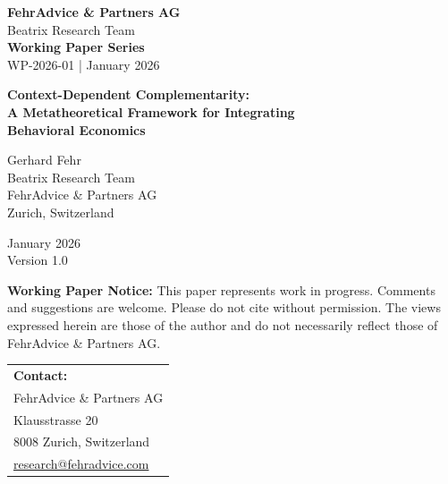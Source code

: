 \documentclass[12pt,a4paper]{article}
\theoremstyle{definition}
\begin{document}
\begin{titlepage}
\centering

\vspace*{1cm}

\begin{tcolorbox}[
    colback=blue!5!white,
    colframe=blue!75!black,
    width=\textwidth,
    arc=0mm,
    boxrule=1pt
]
\centering
\large\textbf{FehrAdvice \& Partners AG}\\[0.5em]
\normalsize Beatrix Research Team\\[1em]
\Large\textbf{Working Paper Series}\\[0.5em]
\normalsize WP-2026-01 | January 2026
\end{tcolorbox}

\vspace{2cm}

{\LARGE\bfseries Context-Dependent Complementarity:\\[0.5em]
A Metatheoretical Framework for Integrating\\[0.3em]
Behavioral Economics}

\vspace{2cm}

{\Large Gerhard Fehr}\\[0.5em]
{\large Beatrix Research Team}\\[0.3em]
{\normalsize FehrAdvice \& Partners AG}\\[0.3em]
{\normalsize Zurich, Switzerland}

\vspace{2cm}

{\large January 2026}\\[1em]
{\normalsize Version 1.0}

\vspace{2cm}

\begin{tcolorbox}[
    colback=yellow!10!white,
    colframe=orange!75!black,
    width=0.9\textwidth,
    arc=2mm
]
\small
\textbf{Working Paper Notice:} This paper represents work in progress. Comments and suggestions are welcome. Please do not cite without permission. The views expressed herein are those of the author and do not necessarily reflect those of FehrAdvice \& Partners AG.
\end{tcolorbox}

\vfill

\begin{tabular}{l}
\textbf{Contact:} \\
FehrAdvice \& Partners AG \\
Klausstrasse 20 \\
8008 Zurich, Switzerland \\
\href{mailto:research@fehradvice.com}{research@fehradvice.com}
\end{tabular}

\end{titlepage}
\end{document}
